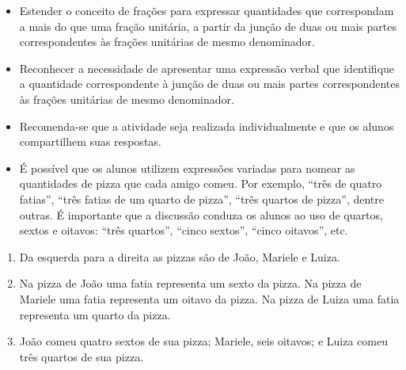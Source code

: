 \pagebreak

\begin{objetivos}[code={\setcounter{tcb@cnt@objetivos}{0}}, label=chap2-ativ1]{}{}  %
  \begin{itemize} %
\item Estender o conceito de frações para expressar quantidades que correspondam a mais do que uma fração unitária, a partir da junção de duas ou mais partes correspondentes às frações unitárias de mesmo denominador.
\item Reconhecer a necessidade de apresentar uma expressão verbal que identifique a quantidade correspondente à junção de duas ou mais partes correspondentes às frações unitárias de mesmo denominador.
  \end{itemize} %
\end{objetivos}

\begin{orientacoes}{}{}
  \begin{itemize} %
\item Recomenda-se que a atividade seja realizada individualmente e que os alunos compartilhem suas respostas. 
\item É possível que os alunos utilizem expressões variadas para nomear as quantidades de pizza que cada amigo comeu. Por exemplo, ``três de quatro fatias'', ``três fatias de um quarto de pizza'', ``três quartos de pizza'', dentre outras. É importante que a discussão conduza os alunos ao uso de quartos, sextos e oitavos: ``três quartos'', ``cinco sextos'', ``cinco oitavos'', etc. 
\end{itemize} %
\end{orientacoes}

\begin{solucao}[code={\setcounter{tcb@cnt@solucao}{0}}]{}{}
  \label{ativ:sobra-de-pizza}
\begin{enumerate} [\quad a)] %
\item Da esquerda para a direita as pizzas são de João, Mariele e Luiza.
\item Na pizza de João uma fatia representa um sexto da pizza. \newline
  Na pizza de Mariele uma fatia representa um oitavo da pizza. \newline
  Na pizza de Luiza uma fatia representa um quarto da pizza.
\item João comeu quatro sextos de sua pizza; Mariele, seis oitavos; e Luiza comeu três quartos de sua pizza.
\end{enumerate} %
\end{solucao}
\vfill

